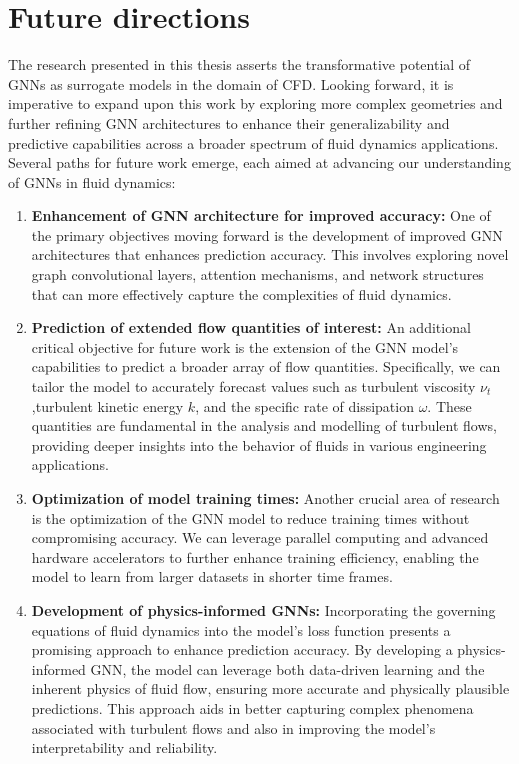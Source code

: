 \section{Future directions}

The research presented in this thesis asserts the transformative potential of GNNs as surrogate models in the domain of CFD. Looking forward, it is imperative to expand upon this work by exploring more complex geometries and further refining GNN architectures to enhance their generalizability and predictive capabilities across a broader spectrum of fluid dynamics applications. Several paths for future work emerge, each aimed at advancing our understanding of GNNs in fluid dynamics:

\begin{enumerate}

    \item \textbf{Enhancement of GNN architecture for improved accuracy:} One of the primary objectives moving forward is the development of  improved GNN architectures that enhances prediction accuracy. This involves exploring novel graph convolutional layers, attention mechanisms, and network structures that can more effectively capture the complexities of fluid dynamics. 
    \item \textbf{Prediction of extended flow quantities of interest:} An additional critical objective for future work is the extension of the GNN model's capabilities to predict a broader array of flow quantities. Specifically, we can tailor the model to accurately forecast values such as turbulent viscosity $\nu_t$,turbulent kinetic energy $k$, and the specific rate of dissipation $\omega$. These quantities are fundamental in the analysis and modelling of turbulent flows, providing deeper insights into the behavior of fluids in various engineering applications.    
    \item \textbf{Optimization of model training times:} Another crucial area of research is the optimization of the GNN model to reduce training times without compromising accuracy. We can leverage parallel computing and advanced hardware accelerators to further enhance training efficiency, enabling the model to learn from larger datasets in shorter time frames.
    
    \item \textbf{Development of physics-informed GNNs:} Incorporating the governing equations of fluid dynamics into the model's loss function presents a promising approach to enhance prediction accuracy. By developing a physics-informed GNN, the model can leverage both data-driven learning and the inherent physics of fluid flow, ensuring more accurate and physically plausible predictions. This approach aids in better capturing complex phenomena associated with turbulent flows and also in improving the model's interpretability and reliability.
  

\end{enumerate}
